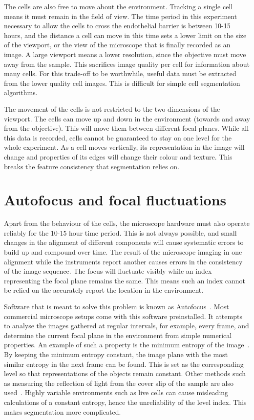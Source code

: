 The cells are also free to move about the environment. Tracking a single cell means it must remain in the field of view. The time period in this experiment necessary to allow the cells to cross the endothelial barrier is between 10-15 hours, and the distance a cell can move in this time sets a lower limit on the size of the viewport, or the view of the microscope that is finally recorded as an image. A large viewport means a lower resolution, since the objective must move away from the sample. This sacrifices image quality per cell for information about many cells. For this trade-off to be worthwhile, useful data must be extracted from the lower quality cell images. This is difficult for simple cell segmentation algorithms.

The movement of the cells is not restricted to the two dimensions of the viewport. The cells can move up and down in the environment (towards and away from the objective). This will move them between different focal planes. While all this data is recorded, cells cannot be guaranteed to stay on one level for the whole experiment. As a cell moves vertically, its representation in the image will change and properties of its edges will change their colour and texture. This breaks the feature consistency that segmentation relies on.

\section{Autofocus and focal fluctuations}

Apart from the behaviour of the cells, the microscope hardware must also operate reliably for the 10-15 hour time period. This is not always possible, and small changes in the alignment of different components will cause systematic errors to build up and compound over time. The result of the microscope imaging in one alignment while the instruments report another causes errors in the consistency of the image sequence. The focus will fluctuate visibly while an index representing the focal plane remains the same. This means such an index cannot be relied on the accurately report the location in the environment.

Software that is meant to solve this problem is known as Autofocus~\cite{Firestone:91}. Most commercial microscope setups come with this software preinstalled. It attempts to analyse the images gathered at regular intervals, for example, every frame, and determine the current focal plane in the environment from simple numerical properties. An example of such a property is the minimum entropy of the image~\cite{Firestone:91}. By keeping the minimum entropy constant, the image plane with the most similar entropy in the next frame can be found. This is set as the corresponding level so that representations of the objects remain constant. Other methods such as measuring the reflection of light from the cover slip of the sample are also used~\cite{Poland:08}. Highly variable environments such as live cells can cause misleading calculations of a constant entropy, hence the unreliability of the level index. This makes segmentation more complicated.
